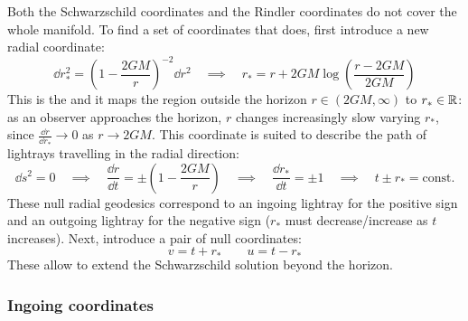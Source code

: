 Both the Schwarzschild coordinates and the Rindler coordinates do not cover the whole manifold. To find a set of coordinates that does, first introduce a new radial coordinate:
\begin{equation}
  \dd r_*^2 = \left( 1 - \frac{2GM}{r} \right)^{-2} \dd r^2
  \quad \implies \quad
  r_* = r + 2GM \log \left( \frac{r - 2GM}{2GM} \right)
\end{equation}
This is the  and it maps the region outside the horizon $ r \in (2GM, \infty) $ to $ r_* \in \mathbb{R} $: as an observer approaches the horizon, $ r $ changes increasingly slow varying $ r_* $, since $ \frac{\dd r}{\dd r_*} \rightarrow 0 $ as $ r \rightarrow 2GM $. This coordinate is suited to describe the path of lightrays travelling in the radial direction:
\begin{equation*}
  \dd s^2 = 0
  \quad \implies \quad
  \frac{\dd r}{\dd t} = \pm \left( 1 - \frac{2GM}{r} \right)
  \quad \implies \quad
  \frac{\dd r_*}{\dd t} = \pm 1
  \quad \implies \quad
  t \pm r_* = \text{const.}
\end{equation*}
These null radial geodesics correspond to an ingoing lightray for the positive sign and an outgoing lightray for the negative sign ($ r_* $ must decrease/increase as $ t $ increases). Next, introduce a pair of null coordinates:
\begin{equation}
  v = t + r_*
  \qquad
  u = t - r_*
\end{equation}
These allow to extend the Schwarzschild solution beyond the horizon.

\subsubsection{Ingoing coordinates}

